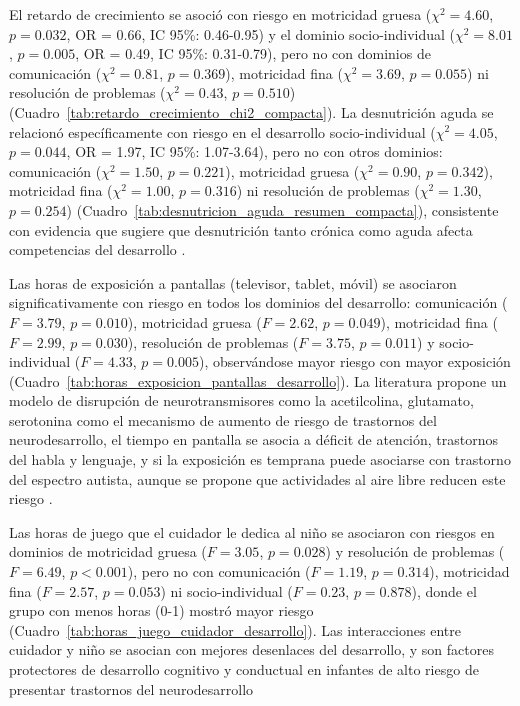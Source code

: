 El retardo de crecimiento se asoció con riesgo en motricidad gruesa
($\chi^2 = 4.60$, $p = 0.032$, OR = 0.66, IC 95\%: 0.46-0.95) y el dominio
socio-individual ($\chi^2 = 8.01$, $p = 0.005$, OR = 0.49, IC 95\%: 0.31-0.79),
pero no con dominios de comunicación ($\chi^2 = 0.81$, $p = 0.369$), motricidad
fina ($\chi^2 = 3.69$, $p = 0.055$) ni resolución de problemas ($\chi^2 = 0.43$, $p = 0.510$) 
(Cuadro~\ref{tab:retardo_crecimiento_chi2_compacta}). La desnutrición aguda 
se relacionó específicamente con riesgo en el desarrollo socio-individual
($\chi^2 = 4.05$, $p = 0.044$, OR = 1.97, IC 95\%: 1.07-3.64), pero no con otros
dominios:  comunicación ($\chi^2 = 1.50$, $p = 0.221$), motricidad gruesa 
($\chi^2 = 0.90$, $p = 0.342$), motricidad fina ($\chi^2 = 1.00$, $p = 0.316$) 
ni resolución de problemas ($\chi^2 = 1.30$, $p = 0.254$) 
(Cuadro~\ref{tab:desnutricion_aguda_resumen_compacta}), consistente con 
evidencia que sugiere que desnutrición tanto crónica como aguda afecta
competencias del desarrollo \cite{Babikako2022,Suryawan2021,vandenHeuvel2019}.

Las horas de exposición a pantallas (televisor, tablet, móvil) se asociaron
significativamente con riesgo en todos los dominios del desarrollo: comunicación
($F = 3.79$, $p = 0.010$), motricidad gruesa ($F = 2.62$, $p = 0.049$),
motricidad fina ($F = 2.99$, $p = 0.030$), resolución de problemas ($F = 3.75$,
$p = 0.011$) y  socio-individual ($F = 4.33$, $p = 0.005$), observándose mayor
riesgo con mayor exposición (Cuadro~\ref{tab:horas_exposicion_pantallas_desarrollo}). La literatura propone un modelo de disrupción de neurotransmisores como la acetilcolina, glutamato, serotonina como el mecanismo de aumento de
riesgo de trastornos del neurodesarrollo, el tiempo en pantalla se asocia a
déficit de atención, trastornos del habla y lenguaje, y si la exposición
es temprana puede asociarse con trastorno del espectro autista, aunque se
propone que actividades al aire libre reducen este riesgo \cite{Priyadarshini2025,Zehra2025,Hill2024,Sarfraz2023,Amorim2023,Sugiyama2023,Goswami2023,Jourdren2023}.

Las horas de juego que el cuidador le dedica al niño se asociaron con riesgos en
dominios de motricidad gruesa ($F = 3.05$, $p = 0.028$) y resolución de
problemas ($F = 6.49$, $p < 0.001$), pero no con comunicación ($F = 1.19$,
$p = 0.314$), motricidad fina ($F = 2.57$, $p = 0.053$) ni socio-individual
($F = 0.23$, $p = 0.878$), donde el grupo con menos horas (0-1) mostró mayor
riesgo (Cuadro~\ref{tab:horas_juego_cuidador_desarrollo}). Las interacciones entre cuidador y niño se asocian con mejores desenlaces del desarrollo, y son factores protectores de desarrollo cognitivo y conductual en infantes de alto riesgo de presentar trastornos del neurodesarrollo \cite{Jaffee2007,Isaev2023,Schneider2022}

